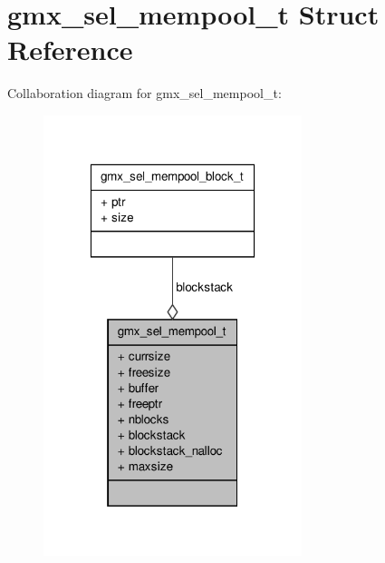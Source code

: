 \hypertarget{structgmx__sel__mempool__t}{\section{gmx\-\_\-sel\-\_\-mempool\-\_\-t \-Struct \-Reference}
\label{structgmx__sel__mempool__t}
}


\-Collaboration diagram for gmx\-\_\-sel\-\_\-mempool\-\_\-t\-:
\nopagebreak
\begin{figure}[H]
\begin{center}
\leavevmode
\includegraphics[width=214pt]{structgmx__sel__mempool__t__coll__graph}
\end{center}
\end{figure}
